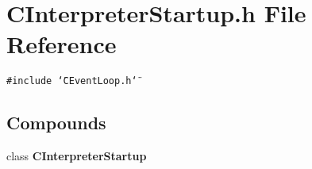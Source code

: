 \section{CInterpreter\-Startup.h File Reference}
\label{CInterpreterStartup_8h}
{\tt \#include \char`\"{}CEvent\-Loop.h\char`\"{}}\par
\subsection*{Compounds}
\begin{CompactItemize}
\item 
class {\bf CInterpreter\-Startup}
\end{CompactItemize}
